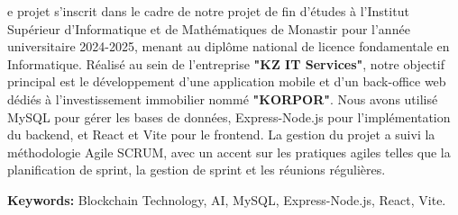 \noindent {}e projet s'inscrit dans le cadre de notre projet de fin d'études à l'Institut Supérieur d'Informatique et de Mathématiques de Monastir pour l'année universitaire 2024-2025, menant au diplôme national de licence fondamentale en Informatique.
Réalisé au sein de l'entreprise \textbf{\textcolor{primary}{"KZ IT Services"}}, notre objectif principal est le développement d'une application mobile et d'un back-office web dédiés à l'investissement immobilier nommé \textbf{\textcolor{primary}{"KORPOR"}}. Nous avons utilisé MySQL pour gérer les bases de données, Express-Node.js pour l'implémentation du backend, et React et Vite pour le frontend.
La gestion du projet a suivi la méthodologie Agile SCRUM, avec un accent sur les pratiques agiles telles que la planification de sprint, la gestion de sprint et les réunions régulières.

\vspace{0.3cm}
\begin{tcolorbox}[
    colback=background,
    colframe=primary,
    arc=1mm,
    boxrule=0.5pt,
    left=8pt,
    right=8pt,
    top=4pt,
    bottom=4pt,
    width=\textwidth
]
\textbf{Keywords:} Blockchain Technology, AI, MySQL, Express-Node.js, React, Vite.
\end{tcolorbox}

\nopagebreak 